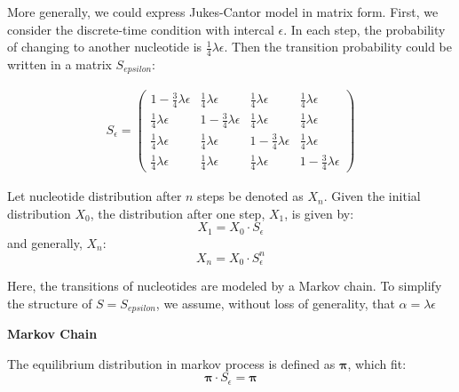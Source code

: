 \documentclass[12pt]{book}
\begin{document}
        More generally, we could express Jukes-Cantor model in matrix form. First, we consider the discrete-time condition with intercal $\epsilon$. In each step, the probability of changing to another nucleotide is $\frac{1}{4} \lambda \epsilon$. Then the transition probability could be written in a matrix $S_{epsilon}$:

        \begin{align*}
            S_{\epsilon} = \left(
                \begin{matrix}
                    1 - \frac{3}{4} \lambda \epsilon & \frac{1}{4} \lambda \epsilon & \frac{1}{4} \lambda \epsilon & \frac{1}{4} \lambda \epsilon\\
                    \frac{1}{4} \lambda \epsilon & 1 - \frac{3}{4} \lambda \epsilon & \frac{1}{4} \lambda \epsilon & \frac{1}{4} \lambda \epsilon\\
                    \frac{1}{4} \lambda \epsilon & \frac{1}{4} \lambda \epsilon & 1 - \frac{3}{4} \lambda \epsilon & \frac{1}{4} \lambda \epsilon\\
                    \frac{1}{4} \lambda \epsilon & \frac{1}{4} \lambda \epsilon & \frac{1}{4} \lambda \epsilon & 1 - \frac{3}{4} \lambda \epsilon
                \end{matrix}
            \right)
        \end{align*}

        Let nucleotide distribution after $n$ steps be denoted as $X_n$. Given the initial distribution $X_0$, the distribution after one step, $X_1$, is given by:
        \begin{equation*}
            X_1 = X_0 \cdot S_{\epsilon}
        \end{equation*}
        and generally, $X_n$:
        \begin{equation*}
            X_n = X_0 \cdot S_{\epsilon}^n
        \end{equation*}

        Here, the transitions of nucleotides are modeled by a Markov chain. To simplify the structure of $S = S_{epsilon}$, we assume, without loss of generality, that $\alpha = \lambda \epsilon$

        \textbf{Markov Chain}

        The equilibrium distribution in markov process is defined as $\boldsymbol{\pi}$, which fit:
        \begin{equation*}
            \boldsymbol{\pi} \cdot S_{\epsilon} = \boldsymbol{\pi}
        \end{equation*}
\end{document}
